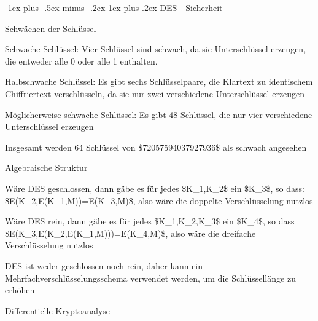 \documentclass[a4paper]{article}
\makeatletter
\renewcommand{\subsubsection}{\@startsection{subsubsection}{3}{0mm}%
 {-1ex plus -.5ex minus -.2ex}%
 {1ex plus .2ex}%
 {\normalfont\small\bfseries}}
\makeatother
\begin{document}
\begin{multicols}{3}
      \subsubsection{DES - Sicherheit}

      \begin{itemize*}
            \item
            Schwächen der Schlüssel

            \begin{itemize*}
                  \item Schwache Schlüssel: Vier Schlüssel sind schwach, da sie Unterschlüssel erzeugen, die entweder alle 0 oder alle 1 enthalten.
                  \item Halbschwache Schlüssel: Es gibt sechs Schlüsselpaare, die Klartext zu identischem Chiffriertext verschlüsseln, da sie nur zwei verschiedene Unterschlüssel erzeugen
                  \item Möglicherweise schwache Schlüssel: Es gibt 48 Schlüssel, die nur vier verschiedene Unterschlüssel erzeugen
                  \item Insgesamt werden 64 Schlüssel von \$72057594037927936\$ als schwach angesehen
            \end{itemize*}
            \item
            Algebraische Struktur

            \begin{itemize*}
                  \item Wäre DES geschlossen, dann gäbe es für jedes \$K\_1,K\_2\$ ein \$K\_3\$, so dass: \$E(K\_2,E(K\_1,M))=E(K\_3,M)\$, also wäre die doppelte Verschlüsselung nutzlos
                  \item Wäre DES rein, dann gäbe es für jedes \$K\_1,K\_2,K\_3\$ ein \$K\_4\$, so dass \$E(K\_3,E(K\_2,E(K\_1,M)))=E(K\_4,M)\$, also wäre die dreifache Verschlüsselung nutzlos
                  \item DES ist weder geschlossen noch rein, daher kann ein Mehrfachverschlüsselungsschema verwendet werden, um die Schlüssellänge zu erhöhen
            \end{itemize*}
            \item
            Differentielle Kryptoanalyse


\end{itemize*}
\end{multicols}
\end{document}
